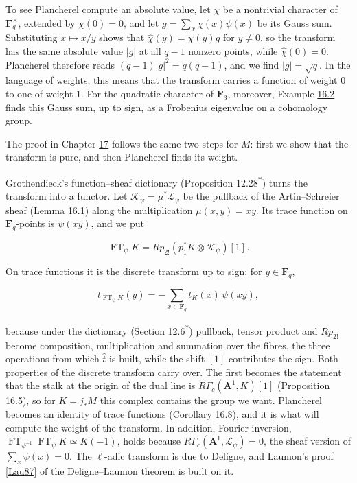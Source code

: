 \documentclass[11pt]{article}
\newcommand{\bpout}[1]{#1\textsuperscript{\hyperlink{bp-outside}{\ensuremath{\ast}}}}
\begin{document}
To see Plancherel compute an absolute value, let \(\chi\) be a nontrivial character of \(\mathbf F_q^\times\), extended by \(\chi(0)=0\), and let \(g=\sum_x\chi(x)\psi(x)\) be its Gauss sum. Substituting \(x\mapsto x/y\) shows that \(\hat\chi(y)=\overline\chi(y)g\) for \(y\ne0\), so the transform has the same absolute value \(|g|\) at all \(q-1\) nonzero points, while \(\hat\chi(0)=0\). Plancherel therefore reads \((q-1)|g|^2=q(q-1)\), and we find \(|g|=\sqrt q\). In the language of weights, this means that the transform carries a function of weight \(0\) to one of weight \(1\). For the quadratic character of \(\mathbf F_3\), moreover, Example \hyperref[bp174]{16.2} finds this Gauss sum, up to sign, as a Frobenius eigenvalue on a cohomology group.

The proof in Chapter \hyperref[bp223]{17} follows the same two steps for \(M\): first we show that the transform is pure, and then Plancherel finds its weight.

Grothendieck's function–sheaf dictionary (Proposition \bpout{12.28}) turns the transform into a functor. Let \(\mathcal K_\psi=\mu^*\mathcal L_\psi\) be the pullback of the Artin–Schreier sheaf (Lemma \hyperref[bp171]{16.1}) along the multiplication \(\mu(x,y)=xy\). Its trace function on \(\mathbf F_q\)-points is \(\psi(xy)\), and we put

\[
\operatorname{FT}_\psi K=Rp_{2!}(p_1^*K\otimes\mathcal K_\psi)[1].
\]

On trace functions it is the discrete transform up to sign: for \(y\in\mathbf F_q\),

\[
t_{\operatorname{FT}_\psi K}(y)=-\sum_{x\in\mathbf F_q}t_K(x)\,\psi(xy),
\]

because under the dictionary (Section \bpout{12.6}) pullback, tensor product and \(Rp_{2!}\) become composition, multiplication and summation over the fibres, the three operations from which \(\hat t\) is built, while the shift \([1]\) contributes the sign. Both properties of the discrete transform carry over. The first becomes the statement that the stalk at the origin of the dual line is \(R\Gamma_c(\mathbf A^1,K)[1]\) (Proposition \hyperref[bp183]{16.5}), so for \(K=j_*M\) this complex contains the group we want. Plancherel becomes an identity of trace functions (Corollary \hyperref[bp192]{16.8}), and it is what will compute the weight of the transform. In addition, Fourier inversion, \(\operatorname{FT}_{\psi^{-1}}\operatorname{FT}_\psi K\simeq K(-1)\), holds because \(R\Gamma_c(\mathbf A^1,\mathcal L_\psi)=0\), the sheaf version of \(\sum_x\psi(x)=0\). The \(\ell\)-adic transform is due to Deligne, and Laumon's proof [\hyperref[bp352]{Lau87}] of the Deligne–Laumon theorem is built on it.
\end{document}
